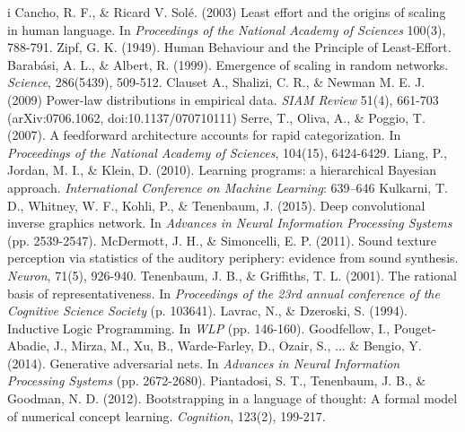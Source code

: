 \documentclass[11pt,letterpaper]{article}
\begin{document}
\begin{thebibliography}{}
   i Cancho, R. F., \& Ricard V. Solé. (2003)
    Least effort and the origins of scaling in human language.
    In \emph{Proceedings of the National Academy of Sciences} 100(3), 788-791.
   Zipf, G. K. (1949).
    Human Behaviour and the Principle of Least-Effort.
    Barab\'asi, A. L., \& Albert, R. (1999).
    Emergence of scaling in random networks.
    \emph{Science}, 286(5439), 509-512.
   Clauset A., Shalizi, C. R., \& Newman M. E. J.  (2009)
    Power-law distributions in empirical data.
    \emph{SIAM Review} 51(4), 661-703 (arXiv:0706.1062, doi:10.1137/070710111)
    Serre, T., Oliva, A., \& Poggio, T. (2007).
    A feedforward architecture accounts for rapid categorization.
    In \emph{Proceedings of the National Academy of Sciences}, 104(15), 6424-6429.
    Liang, P., Jordan, M. I., \& Klein, D. (2010).
    Learning programs: a hierarchical Bayesian approach.
    \emph{International Conference on Machine Learning}: 639–646
    Kulkarni, T. D., Whitney, W. F., Kohli, P., \& Tenenbaum, J. (2015).
      Deep convolutional inverse graphics network.
      In \emph{Advances in Neural Information Processing Systems} (pp. 2539-2547).
    McDermott, J. H., \& Simoncelli, E. P. (2011).
      Sound texture perception via statistics of the auditory periphery: evidence from sound synthesis.
      \emph{Neuron}, 71(5), 926-940.
    Tenenbaum, J. B., \& Griffiths, T. L. (2001).
      The rational basis of representativeness.
      In \emph{Proceedings of the 23rd annual conference of the Cognitive
      Science Society} (p. 103641).
    Lavrac, N., \& Dzeroski, S. (1994).
      Inductive Logic Programming.
      In \emph{WLP} (pp. 146-160).
    Goodfellow, I., Pouget-Abadie, J., Mirza, M., Xu, B., Warde-Farley, D.,
      Ozair, S., ... \& Bengio, Y. (2014).
      Generative adversarial nets.
      In \emph{Advances in Neural Information Processing Systems} (pp. 2672-2680).
    Piantadosi, S. T., Tenenbaum, J. B., \& Goodman, N. D. (2012).
      Bootstrapping in a language of thought: A formal model of numerical concept learning.
      \emph{Cognition}, 123(2), 199-217.
\end{thebibliography}
\end{document}
